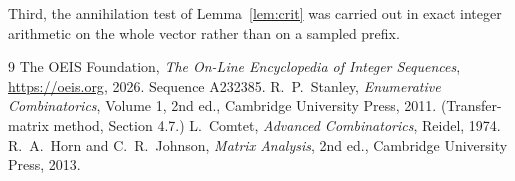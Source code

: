 \documentclass[11pt,a4paper]{article}
\theoremstyle{plain}
\theoremstyle{definition}
\begin{document}
Third, the annihilation test of Lemma~\ref{lem:crit} was carried out in exact integer
arithmetic on the whole vector rather than on a sampled prefix.

\begin{thebibliography}{9}
 The OEIS Foundation, \emph{The On-Line Encyclopedia of Integer
Sequences}, \url{https://oeis.org}, 2026. Sequence A232385.
 R.~P.~Stanley, \emph{Enumerative Combinatorics}, Volume 1, 2nd ed.,
Cambridge University Press, 2011. (Transfer-matrix method, Section 4.7.)
 L.~Comtet, \emph{Advanced Combinatorics}, Reidel, 1974.
 R.~A.~Horn and C.~R.~Johnson, \emph{Matrix Analysis}, 2nd ed., Cambridge
University Press, 2013.
\end{thebibliography}
\end{document}
